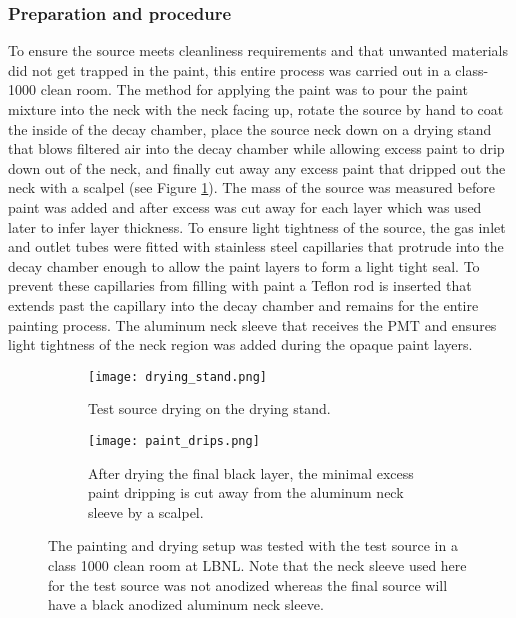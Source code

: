 \subsubsection{Preparation and procedure} 
To ensure the source meets cleanliness requirements and that unwanted materials did not get trapped in the paint, this entire process was carried out in a class-1000 clean room. The method for applying the paint was to pour the paint mixture into the neck with the neck facing up, rotate the source by hand to coat the inside of the decay chamber, place the source neck down on a drying stand that blows filtered air into the decay chamber while allowing excess paint to drip down out of the neck, and finally cut away any excess paint that dripped out the neck with a scalpel (see Figure \ref{fig:drying}). The mass of the source was measured before paint was added and after excess was cut away for each layer which was used later to infer layer thickness. To ensure light tightness of the source, the gas inlet and outlet tubes were fitted with stainless steel capillaries that protrude into the decay chamber enough to allow the paint layers to form a light tight seal. To prevent these capillaries from filling with paint a Teflon rod is inserted that extends past the capillary into the decay chamber and remains for the entire painting process. The aluminum neck sleeve that receives the PMT and ensures light tightness of the neck region was added during the opaque paint layers.

\begin{figure}
\begin{subfigure}{.28\textwidth}
  \texttt{[image: drying\_stand.png]}
  \caption{Test source drying on the drying stand.}
\end{subfigure}
\hspace{0.5cm}
\begin{subfigure}{.67\textwidth}
  \texttt{[image: paint\_drips.png]}
  \caption{After drying the final black layer, the minimal excess paint dripping is cut away from the aluminum neck sleeve by a scalpel.}
\end{subfigure}
\caption{The painting and drying setup was tested with the test source in a class 1000 clean room at LBNL. Note that the neck sleeve used here for the test source was not anodized whereas the final source will have a black anodized aluminum neck sleeve.}
\label{fig:drying}
\end{figure}

